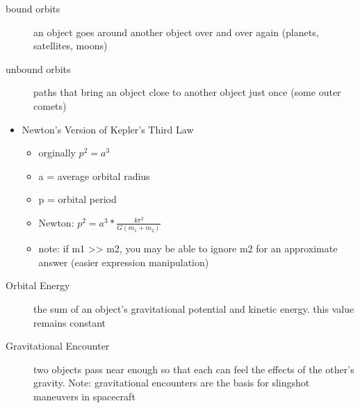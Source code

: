 \begin{description}
\item[bound orbits] an object goes around another object over and over again (planets, satellites, moons)
\item[unbound orbits] paths that bring an object close to another object just once (some outer comets)
\end{description}


\begin{itemize}
\item Newton's Version of Kepler's Third Law
\begin{itemize}
\item orginally $p^2 = a^3$
\item a = average orbital radius
\item p = orbital period
\item Newton: $p^2 = a^3 * \frac{4\pi^2}{G(m_1 + m_2)}$
\item note: if m1 >> m2, you may be able to ignore m2 for an approximate answer (easier expression manipulation)
\end{itemize}
\end{itemize}

\begin{description}
\item[Orbital Energy] the sum of an object's gravitational potential and kinetic energy. this value remains constant
\item[Gravitational Encounter] two objects pass near enough so that each can feel the effects of the other’s gravity. Note: gravitational encounters are the basis for slingshot maneuvers in spacecraft
\end{description}

